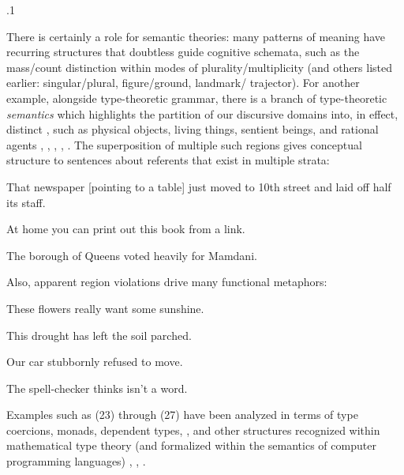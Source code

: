 \documentclass[11pt, twocolumn]{article}
\begin{document}
\p.1{%
\:\+There is certainly a role for semantic theories:
many patterns of meaning have recurring structures
that doubtless guide cognitive schemata,
such as the mass/count distinction within modes
of plurality/multiplicity (and others listed earlier:
singular/plural, figure/ground, landmark/ trajector). \> 
For another example, alongside type-theoretic
grammar, there is a branch of type-theoretic
\textit{semantics} which highlights the partition
of our discursive domains into, in effect,
distinct , such as
physical objects, living things, sentient
beings, and rational agents , ,
, ,
. \>  The superposition of
multiple such regions gives conceptual structure
to sentences about referents that exist in multiple strata:

\begin{exsGroup}

\exsItem{}  \>  That newspaper [pointing to a table] just moved to 10th street
and laid off half its staff. {\sssm}\vspace{1pt}

\exsItem{}  \>  At home you can print out this book from a  link. {\sssm}\upAdj{12pt}

\exsItem{}  \>  The borough of Queens voted heavily for Mamdani.\upAdj{12pt} \> 

\end{exsGroup}

\nip{}%
Also, apparent region violations drive many functional metaphors:

\begin{exsGroup}

\exsItem{}  \>  These flowers really want some sunshine. {\sssm}

\exsItem{}  \>  This drought has left the soil parched. {\sssm}

\exsItem{}  \>  Our car stubbornly refused to move. {\sssm}

\exsItem{}  \>  The spell-checker thinks  isn't a word.\vspace{2pt} \> 

\end{exsGroup}

\nip{}%
Examples such as \exsRef(23) through \exsRef(27) have been analyzed in terms of
type coercions, monads, dependent types, , and
other structures recognized within mathematical type theory (and
formalized within the semantics of computer programming languages)
, , .\<\;
}%
\end{document}
